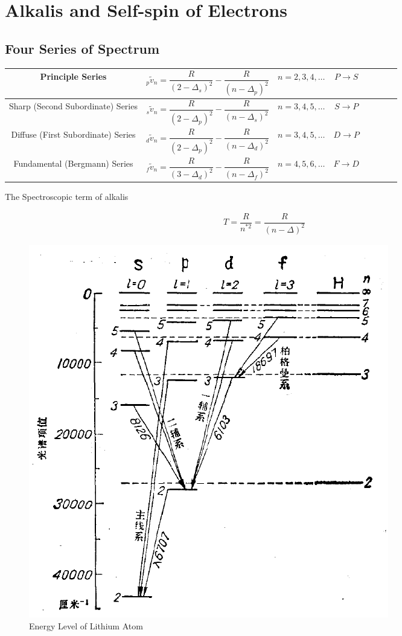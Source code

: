 \chapter{Alkalis and Self-spin of Electrons}

\section{Four Series of Spectrum}

\begin{table}[h]
  \centering
  \begin{tabular}{|Sc|Sc|Sc|Sc|}
    \hline
    Principle Series & ${}_p\tilde{v}_n = \dfrac{R}{\left( 2 - \Delta_s \right)^2} - \dfrac{R}{\left( n - \Delta_p \right)^2}  $& $n = 2,3,4,\dots$ & $P \rightarrow S$\\
    \hline
    Sharp (Second Subordinate) Series & ${}_s\tilde{v}_n = \dfrac{R}{\left( 2 - \Delta_p \right)^2} - \dfrac{R}{\left( n - \Delta_s \right)^2}  $& $n = 3,4,5,\dots$ & $S \rightarrow P$\\
    \hline
    Diffuse (First Subordinate) Series & ${}_d\tilde{v}_n = \dfrac{R}{\left( 2 - \Delta_p \right)^2} - \dfrac{R}{\left( n - \Delta_d \right)^2}  $& $n = 3,4,5,\dots$ & $D \rightarrow P$\\
    \hline
    Fundamental (Bergmann) Series & ${}_f\tilde{v}_n = \dfrac{R}{\left( 3 - \Delta_d \right)^2} - \dfrac{R}{\left( n - \Delta_f \right)^2}  $& $n = 4,5,6,\dots$ & $F \rightarrow D$\\
    \hline
  \end{tabular}
\end{table}

The Spectroscopic term of alkalis

\begin{equation}
  \begin{aligned}
    T = \dfrac{R}{n^{*2}} = \dfrac{R}{\left( n - \Delta \right)^2}  
  \end{aligned}
\end{equation}

\begin{figure}[H]
  \centering
  \includegraphics[width=0.4\linewidth]{figures/Energy-Level-Lithium}
  \caption{Energy Level of Lithium Atom}
\end{figure}


